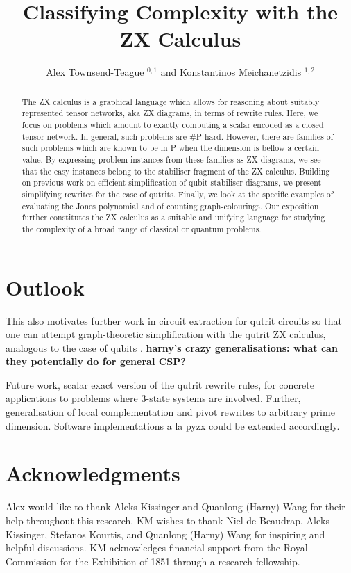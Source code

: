 \documentclass[submission,copyright,creativecommons]{eptcs}
\title{Classifying Complexity with the ZX Calculus}
\author{  Alex Townsend-Teague $^{0,1}$ and Konstantinos Meichanetzidis $^{1,2}$
\institute{$^0$ Mathematical Institute, University of Oxford}
\institute{$^1$ Department of Computer Science, University of Oxford}
\institute{$^2$ Cambridge Quantum Computing Ltd.} }
\begin{document}
\maketitle
\begin{abstract}
The ZX calculus is a graphical language which allows for reasoning about suitably represented tensor networks, aka ZX diagrams,
in terms of rewrite rules.
Here, we focus on problems which amount to exactly computing
a scalar encoded as a closed tensor network.
In general, such problems are \#P-hard.
However, there are families of such problems which are known to be in P
when the dimension is bellow a certain value.
By expressing problem-instances from these families as ZX diagrams,
we see that the easy instances belong to the stabiliser fragment of the ZX calculus.
Building on previous work on efficient simplification of qubit stabiliser diagrams, we present simplifying rewrites for the case of qutrits.
Finally, we look at the specific examples of evaluating the Jones polynomial
and of counting graph-colourings.
Our exposition further constitutes the ZX calculus as a suitable and unifying language for studying the complexity of
a broad range of classical or quantum problems.
\end{abstract}






\section{Outlook}

This also motivates further work in circuit extraction for qutrit circuits so that one can attempt graph-theoretic simplification with the qutrit ZX calculus, analogous to the case of qubits \cite{graph_theoretic_simplification,backens2020again}.
{\bf harny's crazy generalisations: what can they potentially do for general CSP?}

Future work, scalar exact version of the qutrit rewrite rules,
for concrete applications to problems where $3$-state systems are involved.
Further,
generalisation of local complementation and pivot rewrites to arbitrary prime dimension.
Software implementations a la pyzx could be extended accordingly.

\section{Acknowledgments}
Alex would like to thank Aleks Kissinger and Quanlong (Harny) Wang for their help throughout this research.
KM wishes to thank Niel de Beaudrap, Aleks Kissinger, Stefanos 
Kourtis, and Quanlong (Harny) Wang for inspiring and helpful discussions.
KM acknowledges financial support from the Royal Commission for the Exhibition of 1851 through a research fellowship.
\end{document}
